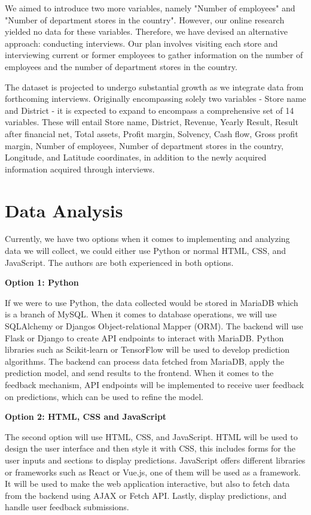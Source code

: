 We aimed to introduce two more variables, namely "Number of employees" and "Number of department stores in the country". However, our online research yielded no data for these variables. Therefore, we have devised an alternative approach: conducting interviews. Our plan involves visiting each store and interviewing current or former employees to gather information on the number of employees and the number of department stores in the country.

\vspace{6pt}
The dataset is projected to undergo substantial growth as we integrate data from forthcoming interviews. Originally encompassing solely two variables - Store name and District - it is expected to expand to encompass a comprehensive set of 14 variables. These will entail Store name, District, Revenue, Yearly Result, Result after financial net, Total assets, Profit margin, Solvency, Cash flow, Gross profit margin, Number of employees, Number of department stores in the country, Longitude, and Latitude coordinates, in addition to the newly acquired information acquired through interviews.

\section{Data Analysis}
Currently, we have two options when it comes to implementing and analyzing data we will collect, we could either use Python or normal HTML, CSS, and JavaScript. The authors are both experienced in both options. 

\textbf{Option 1: Python}


If we were to use Python, the data collected would be stored in MariaDB which is a branch of MySQL. When it comes to database operations, we will use SQLAlchemy or Djangos Object-relational Mapper (ORM). The backend will use Flask or Django to create API endpoints to interact with MariaDB.
Python libraries such as Scikit-learn or TensorFlow will be used to develop prediction algorithms. The backend can process data fetched from MariaDB, apply the prediction model, and send results to the frontend.
When it comes to the feedback mechanism, API endpoints will be implemented to receive user feedback on predictions, which can be used to refine the model.

\textbf{Option 2: HTML, CSS and JavaScript}


The second option will use HTML, CSS, and JavaScript. HTML will be used to design the user interface and then style it with CSS, this includes forms for the user inputs and sections to display predictions.  JavaScript offers different libraries or frameworks such as React or Vue.js, one of them will be used as a framework. It will be used to make the web application interactive, but also to fetch data from the backend using AJAX or Fetch API. Lastly, display predictions, and handle user feedback submissions.


